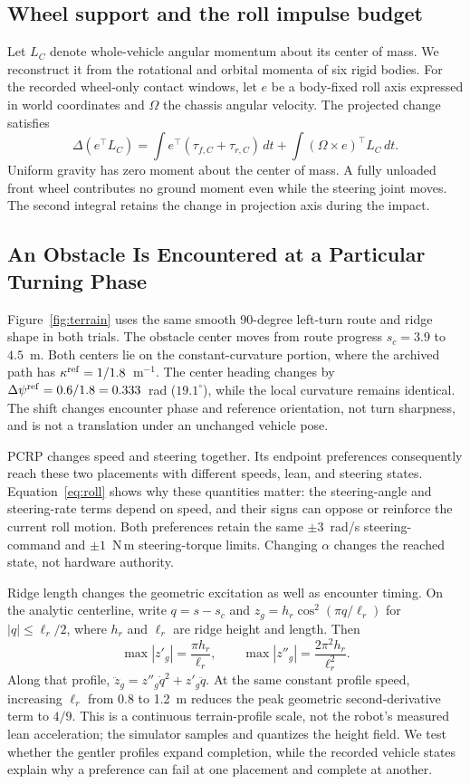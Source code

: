 \documentclass[journal]{IEEEtran}
\begin{document}
\subsection{Wheel support and the roll impulse budget}
Let $L_C$ denote whole-vehicle angular momentum about its center of mass. We reconstruct it from the rotational and orbital momenta of six rigid bodies. For the recorded wheel-only contact windows, let $e$ be a body-fixed roll axis expressed in world coordinates and $\Omega$ the chassis angular velocity. The projected change satisfies
\begin{equation}
\Delta(e^\top L_C)=\int e^\top(\tau_{f,C}+\tau_{r,C})\,dt+
\int (\Omega\times e)^\top L_C\,dt .
\end{equation}
Uniform gravity has zero moment about the center of mass. A fully unloaded front wheel contributes no ground moment even while the steering joint moves. The second integral retains the change in projection axis during the impact.
\subsection{An Obstacle Is Encountered at a Particular Turning Phase}
Figure~\ref{fig:terrain} uses the same smooth 90-degree left-turn route and ridge shape in both trials. The obstacle center moves from route progress $s_c=3.9$ to $4.5$~m. Both centers lie on the constant-curvature portion, where the archived path has $\kappa^{\rm ref}=1/1.8$~m$^{-1}$. The center heading changes by $\Delta\psi^{\rm ref}=0.6/1.8=0.333$~rad ($19.1^\circ$), while the local curvature remains identical. The shift changes encounter phase and reference orientation, not turn sharpness, and is not a translation under an unchanged vehicle pose.

PCRP changes speed and steering together. Its endpoint preferences consequently reach these two placements with different speeds, lean, and steering states. Equation~\eqref{eq:roll} shows why these quantities matter: the steering-angle and steering-rate terms depend on speed, and their signs can oppose or reinforce the current roll motion. Both preferences retain the same $\pm3$~rad/s steering-command and $\pm1$~N\,m steering-torque limits. Changing $\alpha$ changes the reached state, not hardware authority.

Ridge length changes the geometric excitation as well as encounter timing. On the analytic centerline, write $q=s-s_c$ and $z_g=h_r\cos^2(\pi q/\ell_r)$ for $|q|\leq\ell_r/2$, where $h_r$ and $\ell_r$ are ridge height and length. Then
\begin{equation}
 \max|z'_g|=\frac{\pi h_r}{\ell_r},\qquad
 \max|z''_g|=\frac{2\pi^2h_r}{\ell_r^2}.
 \label{eq:ridgeprofile}
\end{equation}
Along that profile, $\ddot z_g=z''_g\dot q^2+z'_g\ddot q$. At the same constant profile speed, increasing $\ell_r$ from 0.8 to 1.2~m reduces the peak geometric second-derivative term to $4/9$. This is a continuous terrain-profile scale, not the robot's measured lean acceleration; the simulator samples and quantizes the height field. We test whether the gentler profiles expand completion, while the recorded vehicle states explain why a preference can fail at one placement and complete at another.
\end{document}
